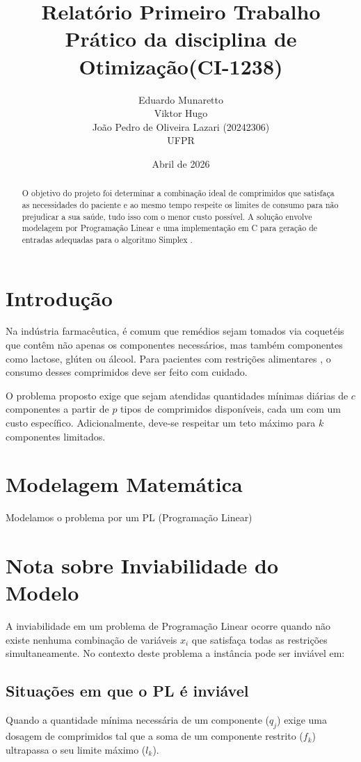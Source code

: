 \documentclass[12pt,a4paper]{article}
\title{\textbf{Relatório Primeiro Trabalho Prático da disciplina de Otimização(CI-1238)}}
\author{
    Eduardo Munaretto \\
    Viktor Hugo \\
    João Pedro de Oliveira Lazari (20242306) \\
    \small{UFPR}
}
\date{Abril de 2026}
\begin{document}
\maketitle

\begin{abstract}
 O objetivo do projeto foi determinar a combinação ideal de comprimidos que satisfaça as  necessidades do paciente e ao mesmo tempo respeite os limites de consumo para não prejudicar a sua saúde, tudo isso com o menor custo possível. A solução envolve modelagem por Programação Linear e uma implementação em C para geração de entradas adequadas para o algoritmo Simplex \texttt{}.
\end{abstract}

\section{Introdução}
Na indústria farmacêutica, é comum que remédios sejam tomados via coquetéis que contêm não apenas os componentes necessários, mas também componentes como lactose, glúten ou álcool. Para pacientes com restrições alimentares , o consumo desses comprimidos deve ser feito com cuidado.

O problema proposto exige que sejam atendidas quantidades mínimas diárias de $c$ componentes a partir de $p$ tipos de comprimidos disponíveis, cada um com um custo específico. Adicionalmente, deve-se respeitar um teto máximo para $k$ componentes limitados.

\section{Modelagem Matemática}

Modelamos o problema por um PL (Programação Linear)

\section{Nota sobre Inviabilidade do Modelo}

A inviabilidade em um problema de Programação Linear ocorre quando não existe nenhuma combinação de variáveis $x_i$ que satisfaça todas as restrições simultaneamente. No contexto deste problema a instância pode ser inviável em:

\subsection{Situações em que o PL é inviável}
Quando a quantidade mínima necessária de um componente ($q_j$) exige uma dosagem de comprimidos tal que a soma de um componente restrito ($f_k$) ultrapassa o seu limite máximo ($l_k$). 
\end{document}
